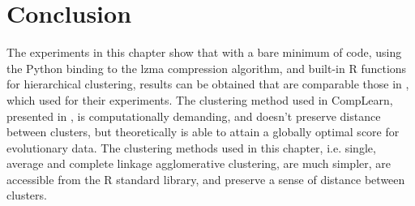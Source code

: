 \section{Conclusion}
The experiments in this chapter show that with a bare minimum of code, using the Python binding to the lzma compression algorithm, and built-in R functions for hierarchical clustering, results can be obtained that are comparable those in \cite{Cilibrasi2005}, which used \cite{CompLearn} for their experiments. The clustering method used in CompLearn, presented in \cite{Cilibrasi2011}, is computationally demanding, and doesn't preserve distance between clusters, but theoretically is able to attain a globally optimal score for evolutionary data. The clustering methods used in this chapter, i.e. single, average and complete linkage agglomerative clustering, are much simpler, are accessible from the R standard library, and preserve a sense of distance between clusters.
